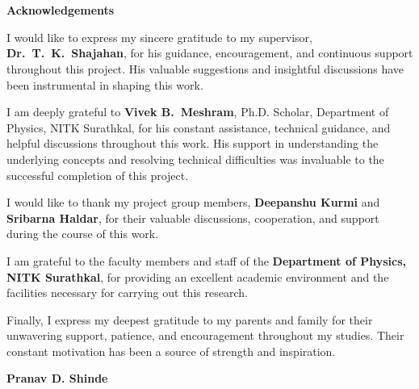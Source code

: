 \chapter*{}

\begin{center}
\vspace*{0.8cm}
{\Huge\bfseries Acknowledgements}
\end{center}

\vspace{0.8cm}

I would like to express my sincere gratitude to my supervisor,
\textbf{Dr.\ T.\ K.\ Shajahan}, for his guidance, encouragement,
and continuous support throughout this project. His valuable
suggestions and insightful discussions have been instrumental in
shaping this work.

\smallskip

I am deeply grateful to \textbf{Vivek B.\ Meshram}, Ph.D. Scholar,
Department of Physics, NITK Surathkal, for his constant assistance,
technical guidance, and helpful discussions throughout this work.
His support in understanding the underlying concepts and resolving
technical difficulties was invaluable to the successful completion
of this project.

\smallskip

I would like to thank my project group members,
\textbf{Deepanshu Kurmi} and \textbf{Sribarna Haldar}, for their
valuable discussions, cooperation, and support during the course of
this work.

\smallskip

I am grateful to the faculty members and staff of the
\textbf{Department of Physics, NITK Surathkal}, for providing an
excellent academic environment and the facilities necessary for
carrying out this research.

\smallskip

Finally, I express my deepest gratitude to my parents and family
for their unwavering support, patience, and encouragement
throughout my studies. Their constant motivation has been a source
of strength and inspiration.

\vspace{2cm}

\begin{flushright}
\textbf{Pranav D. Shinde}
\end{flushright}
